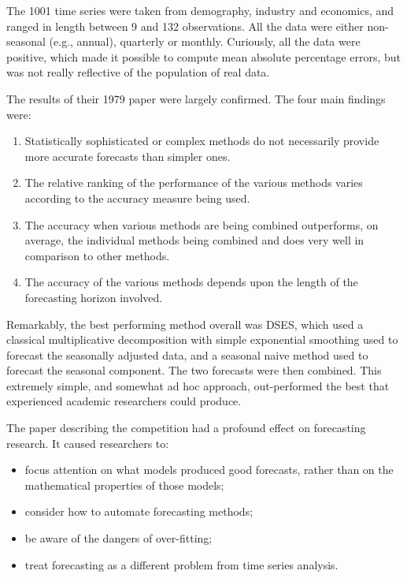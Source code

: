 \documentclass[11pt,a4paper,]{article}
\providecommand{\tightlist}{%
  \setlength{\itemsep}{0pt}\setlength{\parskip}{0pt}}
\begin{document}
The 1001 time series were taken from demography, industry and economics, and ranged in length between 9 and 132 observations. All the data were either non-seasonal (e.g., annual), quarterly or monthly. Curiously, all the data were positive, which made it possible to compute mean absolute percentage errors, but was not really reflective of the population of real data.

The results of their 1979 paper were largely confirmed. The four main findings \autocite[taken from][]{M3} were:

\begin{enumerate}
\def\labelenumi{\arabic{enumi}.}
\tightlist
\item
  Statistically sophisticated or complex methods do not necessarily provide more accurate forecasts than simpler ones.
\item
  The relative ranking of the performance of the various methods varies according to the accuracy measure being used.
\item
  The accuracy when various methods are being combined outperforms, on average, the individual methods being combined and does very well in comparison to other methods.
\item
  The accuracy of the various methods depends upon the length of the forecasting horizon involved.
\end{enumerate}

Remarkably, the best performing method overall was DSES, which used a classical multiplicative decomposition \autocite{fpp2} with simple exponential smoothing used to forecast the seasonally adjusted data, and a seasonal naive method used to forecast the seasonal component. The two forecasts were then combined. This extremely simple, and somewhat ad hoc approach, out-performed the best that experienced academic researchers could produce.

The paper describing the competition \autocite{M1} had a profound effect on forecasting research. It caused researchers to:

\begin{itemize}
\tightlist
\item
  focus attention on what models produced good forecasts, rather than on the mathematical properties of those models;
\item
  consider how to automate forecasting methods;
\item
  be aware of the dangers of over-fitting;
\item
  treat forecasting as a different problem from time series analysis.
\end{itemize}
\end{document}
